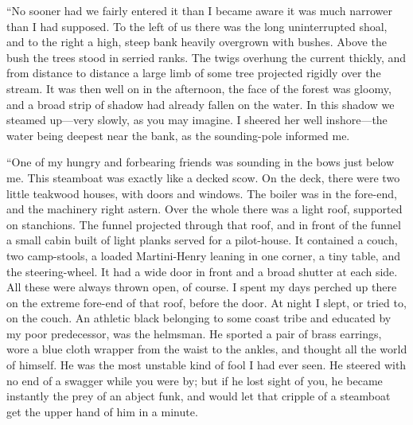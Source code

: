 \documentclass[12pt]{report}
\begin{document}
``No sooner had we fairly entered it than I became aware it was much
narrower than I had supposed. To the left of us there was the long
uninterrupted shoal, and to the right a high, steep bank heavily
overgrown with bushes. Above the bush the trees stood in serried ranks.
The twigs overhung the current thickly, and from distance to distance a
large limb of some tree projected rigidly over the stream. It was then
well on in the afternoon, the face of the forest was gloomy, and a broad
strip of shadow had already fallen on the water. In this shadow we
steamed up---very slowly, as you may imagine. I sheered her well
inshore---the water being deepest near the bank, as the sounding-pole
informed me.

``One of my hungry and forbearing friends was sounding in the bows just
below me. This steamboat was exactly like a decked scow. On the deck,
there were two little teakwood houses, with doors and windows. The
boiler was in the fore-end, and the machinery right astern. Over the
whole there was a light roof, supported on stanchions. The funnel
projected through that roof, and in front of the funnel a small cabin
built of light planks served for a pilot-house. It contained a couch,
two camp-stools, a loaded Martini-Henry leaning in one corner, a tiny
table, and the steering-wheel. It had a wide door in front and a broad
shutter at each side. All these were always thrown open, of course. I
spent my days perched up there on the extreme fore-end of that roof,
before the door. At night I slept, or tried to, on the couch. An
athletic black belonging to some coast tribe and educated by my poor
predecessor, was the helmsman. He sported a pair of brass earrings, wore
a blue cloth wrapper from the waist to the ankles, and thought all the
world of himself. He was the most unstable kind of fool I had ever seen.
He steered with no end of a swagger while you were by; but if he lost
sight of you, he became instantly the prey of an abject funk, and would
let that cripple of a steamboat get the upper hand of him in a minute.
\end{document}
